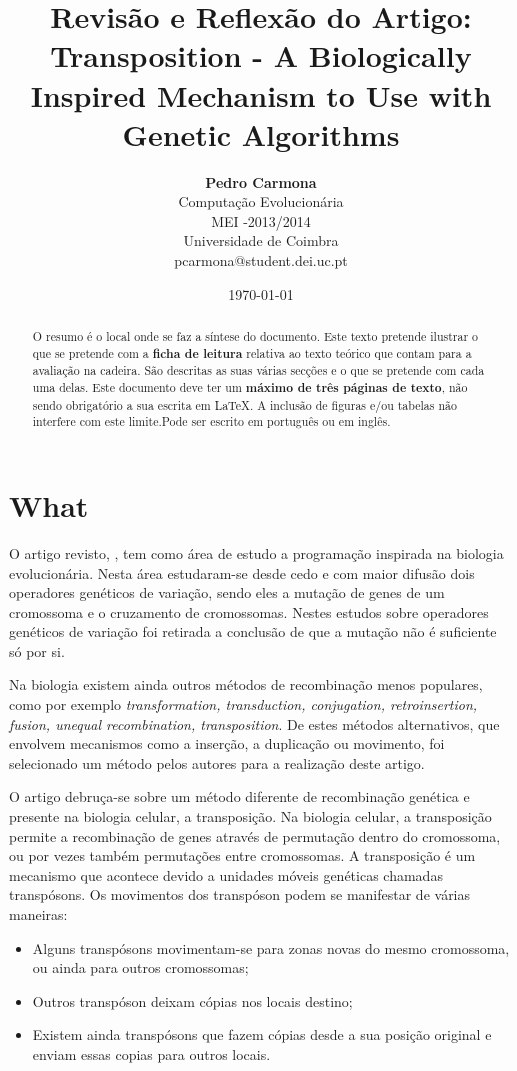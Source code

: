 \documentclass[12pt,portuguese,a4paper]{article}
\title{\LARGE{\textbf{Revisão e Reflexão do Artigo:}}\\ Transposition - A Biologically Inspired Mechanism to Use with Genetic Algorithms \cite{Simoes99transposition:a}}
\author{ \textbf{Pedro Carmona} \\ Computação Evolucionária\\ MEI -2013/2014 \\ Universidade de Coimbra \\ pcarmona@student.dei.uc.pt}
\date{\today}
\begin{document}
\maketitle

\begin{abstract}

O resumo é o local onde se faz a síntese do documento.
Este texto pretende ilustrar o que se pretende com a \textbf{ficha de leitura} relativa ao texto teórico que contam para a avaliação na cadeira. São descritas as suas várias secções e o que se pretende com cada uma delas.  Este documento deve ter um \textbf{máximo de três páginas de texto}, não sendo obrigatório a sua escrita em \LaTeX{}. A inclusão de figuras e/ou tabelas não  interfere com este limite.Pode ser escrito em português ou em inglês.
\end{abstract}

\section{What}


O artigo revisto, \cite{Simoes99transposition:a}, tem como área de estudo a programação inspirada na biologia evolucionária.
Nesta área estudaram-se desde cedo e com maior difusão dois operadores genéticos de variação, sendo eles a mutação de genes de um cromossoma e o cruzamento de cromossomas. Nestes estudos sobre operadores genéticos de variação foi retirada a conclusão de que a mutação não é suficiente só por si.

Na biologia existem ainda outros métodos de recombinação menos populares, como por exemplo \textit{transformation, transduction, conjugation, retroinsertion, fusion, unequal recombination, transposition}\cite{Simoes99transposition:a}. De estes métodos alternativos, que envolvem mecanismos como a inserção, a duplicação ou movimento, foi selecionado um método pelos autores para a realização deste artigo.

O artigo debruça-se sobre um método diferente de recombinação genética e presente na biologia celular, a transposição.
Na biologia celular, a transposição permite a recombinação de genes através de permutação dentro do cromossoma, ou por vezes também permutações entre cromossomas.
A transposição é um mecanismo que acontece devido a unidades móveis genéticas chamadas transpósons.
Os movimentos dos transpóson podem se manifestar de várias maneiras:
\begin{itemize}
    \item Alguns transpósons movimentam-se para zonas novas do mesmo cromossoma, ou ainda para outros cromossomas;
    \item Outros transpóson deixam cópias nos locais destino;
    \item Existem ainda transpósons que fazem cópias desde a sua posição original e enviam essas copias para outros locais.
\end{itemize}
\end{document}
